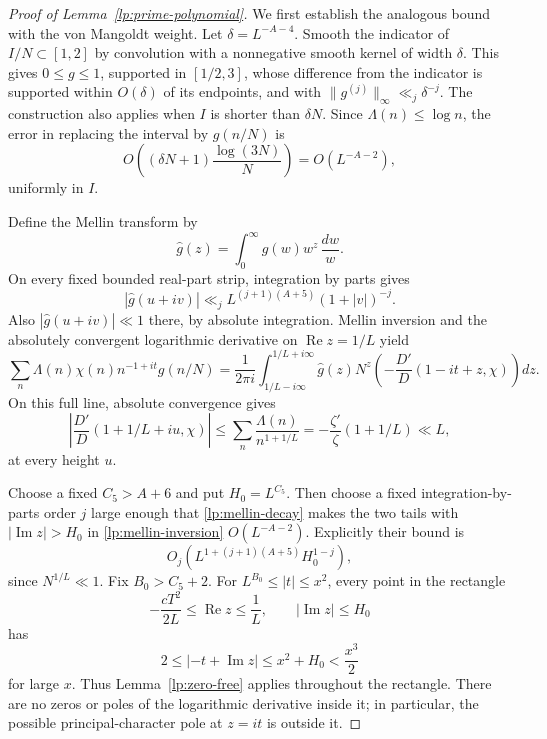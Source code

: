 \begin{proof}[Proof of Lemma~\ref{lp:prime-polynomial}]
We first establish the analogous bound with the von Mangoldt weight.
Let $\delta=L^{-A-4}$.  Smooth the indicator of $I/N\subset[1,2]$
by convolution with a nonnegative smooth kernel of width $\delta$.
This gives $0\le g\le1$, supported in $[1/2,3]$, whose difference
from the indicator is supported within $O(\delta)$ of its endpoints,
and with $\|g^{(j)}\|_\infty\ll_j\delta^{-j}$.
The construction also applies when $I$ is shorter than $\delta N$.
Since $\Lambda(n)\le\log n$, the error in replacing the interval
by $g(n/N)$ is
\begin{equation}\label{lp:smoothing-error}
 O\!\left((\delta N+1)\frac{\log(3N)}N\right)
       =O(L^{-A-2}),
\end{equation}
uniformly in $I$.

Define the Mellin transform by
\[
 \widehat g(z)=\int_0^\infty g(w)w^z\,\frac{dw}{w}.
\]
On every fixed bounded real-part strip, integration by parts gives
\begin{equation}\label{lp:mellin-decay}
 |\widehat g(u+iv)|\ll_j
       L^{(j+1)(A+5)}(1+|v|)^{-j}.
\end{equation}
Also $|\widehat g(u+iv)|\ll1$ there, by absolute integration.
Mellin inversion and the absolutely convergent logarithmic derivative
on $\operatorname{Re}z=1/L$ yield
\begin{equation}\label{lp:mellin-inversion}
 \sum_n\Lambda(n)\chi(n)n^{-1+it}g(n/N)
 =\frac1{2\pi i}\int_{1/L-i\infty}^{1/L+i\infty}
       \widehat g(z)N^z
       \left(-\frac{D'}D(1-it+z,\chi)\right)dz.
\end{equation}
On this full line, absolute convergence gives
\[
 \left|\frac{D'}D(1+1/L+i u,\chi)\right|
 \le\sum_n\frac{\Lambda(n)}{n^{1+1/L}}
       =-\frac{\zeta'}\zeta(1+1/L)\ll L,
\]
at every height $u$.

Choose a fixed $C_5>A+6$ and put $H_0=L^{C_5}$.
Then choose a fixed integration-by-parts order $j$ large enough that
\eqref{lp:mellin-decay} makes the two tails with
$|\operatorname{Im}z|>H_0$ in \eqref{lp:mellin-inversion}
$O(L^{-A-2})$.  Explicitly their bound is
\[
 O_j\!\left(L^{1+(j+1)(A+5)}H_0^{1-j}\right),
\]
since $N^{1/L}\ll1$.  Fix $B_0>C_5+2$.
For $L^{B_0}\le|t|\le x^2$, every point in the rectangle
\[
 -\frac{cT^2}{2L}\le\operatorname{Re}z\le\frac1L,
       \qquad |\operatorname{Im}z|\le H_0
\]
has
\begin{equation}\label{lp:contour-heights}
 2\le|-t+\operatorname{Im}z|
       \le x^2+H_0<\frac{x^3}{2}
\end{equation}
for large $x$.  Thus Lemma~\ref{lp:zero-free} applies throughout
the rectangle.  There are no zeros or poles of the logarithmic
derivative inside it; in particular, the possible principal-character
pole at $z=it$ is outside it.


\end{proof}
